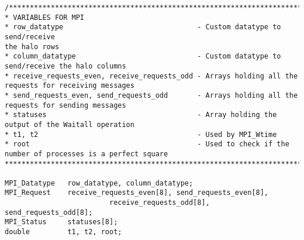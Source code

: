 \clearpage

\begin{tcolorbox}
\begin{verbatim}
/***********************************************************************************
* VARIABLES FOR MPI
* row_datatype                                - Custom datatype to send/receive                                                             the halo rows
* column_datatype                             - Custom datatype to send/receive the halo columns
* receive_requests_even, receive_requests_odd - Arrays holding all the requests for receiving messages
* send_requests_even, send_requests_odd       - Arrays holding all the requests for sending messages
* statuses                                    - Array holding the output of the Waitall operation
* t1, t2                                      - Used by MPI_Wtime
* root                                        - Used to check if the number of processes is a perfect square
************************************************************************************/

MPI_Datatype   row_datatype, column_datatype;
MPI_Request    receive_requests_even[8], send_requests_even[8], 
                         receive_requests_odd[8], send_requests_odd[8];
MPI_Status     statuses[8];
double         t1, t2, root;
\end{verbatim}
\end{tcolorbox}

